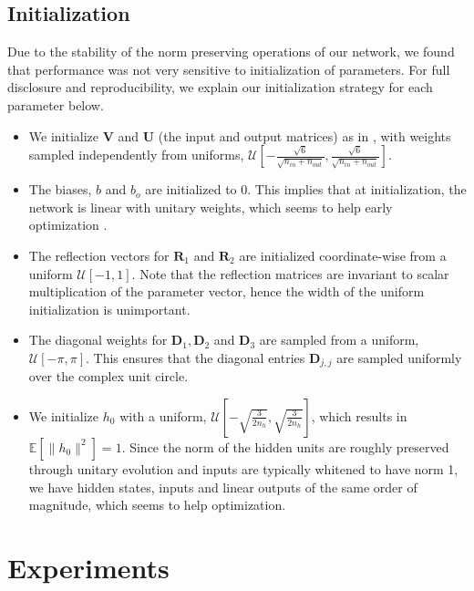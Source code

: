 \documentclass{article} %
\newcommand{\matr}[1]{\mathbf{#1}}
\begin{document}
\vspace{-1mm}
\subsection{Initialization}

Due to the stability of the norm preserving operations of our network, we found that performance was
not very sensitive to initialization of parameters.
For full disclosure and reproducibility, we explain our initialization strategy for each parameter below.
\vspace{-0.25mm}
\begin{itemize}
  \item We initialize $\matr{V}$ and $\matr{U}$ (the input and output matrices) as in \cite{Glorotinit},
  with weights sampled independently from uniforms, $\mathcal{U}\left[-\frac{\sqrt{6}}{\sqrt{n_{in}+ n_{out}}}, \frac{\sqrt{6}}{\sqrt{n_{in}+ n_{out}}}\right]$.
  \item The biases, $b$ and $b_o$ are initialized to 0. This implies that at initialization, 
    the network is linear with unitary weights, which seems to help early optimization \citep{Saxe2014}.
  \item The reflection vectors for $\matr{R}_1$ and $\matr{R}_2$ are initialized coordinate-wise from a 
  uniform $\mathcal{U}[-1, 1]$. Note that the reflection matrices are invariant to scalar multiplication 
  of the parameter vector, hence the width of the uniform initialization is unimportant.
  \item The diagonal weights for $\matr{D}_1, \matr{D}_2$ and $\matr{D}_3$ are sampled 
  from a uniform, $\mathcal{U}[-\pi, \pi]$. This ensures that the diagonal entries $\matr{D}_{j,j}$
  are sampled uniformly over the complex unit circle.
  \item We initialize $h_0$ with a uniform, 
  $\mathcal{U}\left[-\sqrt{\frac{3}{2n_h}}, \sqrt{\frac{3}{2n_h}} \right]$, 
  which results in $\mathbb{E}\left[\|h_0\|^2\right] = 1$. Since the norm of the hidden units are roughly 
  preserved through unitary evolution and inputs are typically whitened to have norm 1, 
  we have hidden states, inputs and linear outputs of the same order of magnitude, which seems to
  help optimization.
\end{itemize}

\section{Experiments}
\label{expts}
\end{document}
